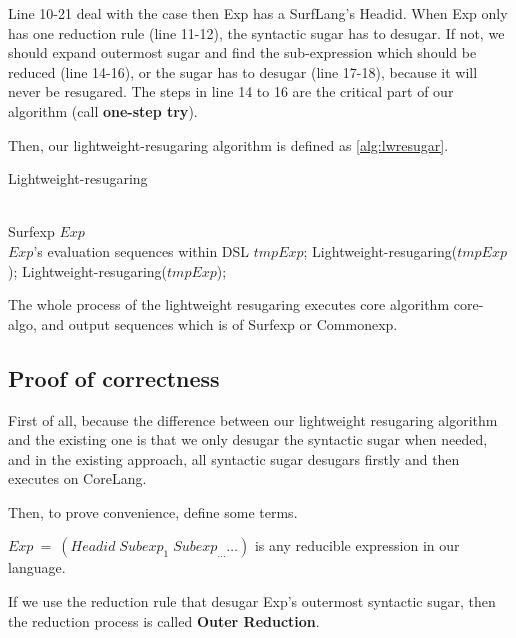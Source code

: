 Line 10-21 deal with the case then Exp has a SurfLang's Headid. When Exp only has one reduction rule (line 11-12), the syntactic sugar has to desugar. If not, we should expand outermost sugar and find the sub-expression which should be reduced (line 14-16), or the sugar has to desugar (line 17-18), because it will never be resugared. The steps in line 14 to 16 are the critical part of our algorithm (call {\bfseries one-step try}\label{mark:onesteptry}).


Then, our lightweight-resugaring algorithm is defined as \ref{alg:lwresugar}.

\begin{algorithm}
	\caption{Lightweight-resugaring}
	\label{alg:lwresugar}     %
	\begin{algorithmic}[1]       %
		\REQUIRE ~~\\      %
		Surfexp $Exp$
		\ENSURE ~~\\     %
		$Exp$'s evaluation sequences within DSL
		\RETURN
		\PRINT $tmpExp$;
		\STATE Lightweight-resugaring($tmpExp$);
		\ELSE
		\STATE Lightweight-resugaring($tmpExp$);
		\ENDIF
		\ENDWHILE

	\end{algorithmic}
\end{algorithm}

The whole process of the lightweight resugaring executes core algorithm core-algo, and output sequences which is of Surfexp or Commonexp.

\subsection{Proof of correctness}

First of all, because the difference between our lightweight resugaring algorithm and the existing one is that we only desugar the syntactic sugar when needed, and in the existing approach, all syntactic sugar desugars firstly and then executes on CoreLang.

Then, to prove convenience, define some terms.

$Exp~=~(Headid\;Subexp_{1}\;Subexp_{\ldots} \ldots)$ is any reducible expression in our language.

If we use the reduction rule that desugar Exp's outermost syntactic sugar, then the reduction process is called {\bfseries Outer Reduction}.

